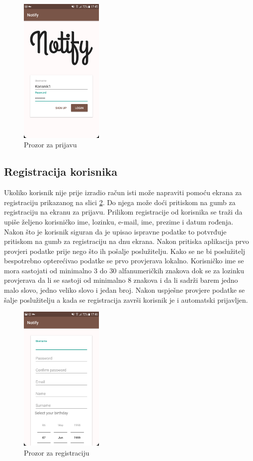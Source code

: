 \documentclass[times, utf8, zavrsni]{fer}
\begin{document}
{\begin{figure}[htb]
\centering
\includegraphics[width=4cm]{img/ss-login.png}
\caption{Prozor za prijavu}
\label{fig:login-image}
\end{figure}

\subsection{Registracija korisnika}
Ukoliko korisnik nije prije izradio račun isti može napraviti pomoću ekrana za registraciju prikazanog na slici \ref{fig:register-image}. Do njega može doći pritiskom na gumb za registraciju  na ekranu za prijavu. Prilikom registracije od korisnika se traži da upiše željeno korisničko ime, lozinku, e-mail, ime, prezime i datum rođenja. Nakon što je korisnik siguran da je upisao ispravne podatke to potvrđuje pritiskom na gumb za registraciju na dnu ekrana. Nakon pritiska aplikacija prvo provjeri podatke prije nego što ih pošalje poslužitelju. Kako se ne bi poslužitelj bespotrebno opterećivao podatke se prvo provjerava lokalno. Korisničko ime se mora sastojati od minimalno 3 do 30 alfanumeričkih znakova dok se za lozinku provjerava da li se sastoji od minimalno 8 znakova i da li sadrži barem jedno malo slovo, jedno veliko slovo i jedan broj. Nakon uspješne provjere podatke se šalje poslužitelju a kada se registracija završi korisnik je i automatski prijavljen.

\begin{figure}[htb]
\centering
\includegraphics[width=4cm]{img/ss-register.png}
\caption{Prozor za registraciju}
\label{fig:register-image}
\end{figure}

}
\end{document}
